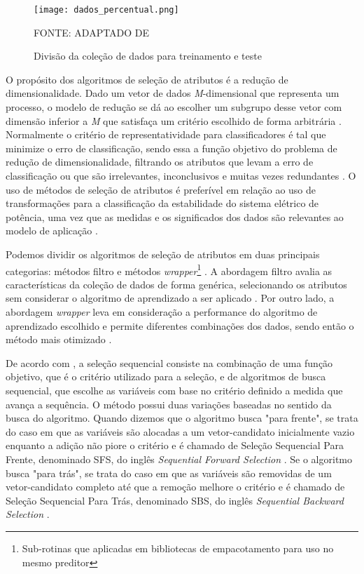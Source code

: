 \documentclass[12pt,oneside,a4paper,chapter=TITLE,section=TITLE,sumario=tradicional,english,brazil]{abntex2}
\begin{document}
\begin{figure}[ht!]
\centering
\caption{Divisão da coleção de dados para treinamento e teste}
\par
\texttt{[image: dados\_percentual.png]}
\centering
\par
FONTE: ADAPTADO DE \cite{haykin2009}
\end{figure}
\par
O propósito dos algoritmos de seleção de atributos é a redução de dimensionalidade. Dado um vetor de dados \textit{M}-dimensional que representa um processo, o modelo de redução se dá ao escolher um subgrupo desse vetor com dimensão inferior a \textit{M} que satisfaça um critério escolhido de forma arbitrária . Normalmente o critério de representatividade para classificadores é tal que minimize o erro de classificação, sendo essa a função objetivo do problema de redução de dimensionalidade, filtrando os atributos que levam a erro de classificação ou que são irrelevantes, inconclusivos e muitas vezes redundantes \cite{smagt2011}. O uso de métodos de seleção de atributos é preferível em relação ao uso de transformações para a classificação da estabilidade do sistema elétrico de potência, uma vez que as medidas e os significados dos dados são relevantes ao modelo de aplicação \cite{smagt2011}.\par 
Podemos dividir os algoritmos de seleção de atributos em duas principais categorias: métodos filtro e métodos \textit{wrapper}\footnote{Sub-rotinas que aplicadas em bibliotecas de empacotamento para uso no mesmo preditor} \cite{kohavi1997}. A abordagem filtro avalia as características da coleção de dados de forma genérica, selecionando os atributos sem considerar o algoritmo de aprendizado a ser aplicado \cite{alonso2007}. Por outro lado, a abordagem \textit{wrapper} leva em consideração a performance do algoritmo de aprendizado escolhido e permite diferentes combinações dos dados, sendo então o método mais otimizado \cite{kohavi1997}.\par 
De acordo com \textcite{theodoridis2003}, a seleção sequencial consiste na combinação de uma função objetivo, que é o critério utilizado para a seleção, e de algoritmos de busca sequencial, que escolhe as variáveis com base no critério definido a medida que avança a sequência. O método possui duas variações baseadas no sentido da busca do algoritmo. Quando dizemos que o algoritmo busca "para frente", se trata do caso em que as variáveis são alocadas a um vetor-candidato inicialmente vazio enquanto a adição não piore o critério e é chamado de Seleção Sequencial Para Frente, denominado SFS, do inglês \textit{Sequential Forward Selection} \cite{bishop2006}. Se o algoritmo busca "para trás", se trata do caso em que as variáveis são removidas de um vetor-candidato completo até que a remoção melhore o critério e é chamado de Seleção Sequencial Para Trás, denominado SBS, do inglês \textit{Sequential Backward Selection} \cite{bishop2006}.\par 
\end{document}
